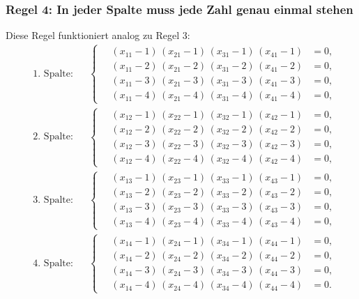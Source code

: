 \subsubsection{Regel 4: In jeder Spalte muss jede Zahl genau einmal stehen}
Diese Regel funktioniert analog zu Regel 3:
\begin{align}
&\text{1. Spalte:}
&&
\left\{\quad
  \begin{aligned}
  (x_{11} - 1)\,(x_{21} - 1)\,(x_{31} - 1)\,(x_{41} - 1) &= 0,\\
  (x_{11} - 2)\,(x_{21} - 2)\,(x_{31} - 2)\,(x_{41} - 2) &= 0,\\
  (x_{11} - 3)\,(x_{21} - 3)\,(x_{31} - 3)\,(x_{41} - 3) &= 0,\\
  (x_{11} - 4)\,(x_{21} - 4)\,(x_{31} - 4)\,(x_{41} - 4) &= 0,
  \end{aligned}
\right.
\\
&\text{2. Spalte:}
&&
\left\{\quad
  \begin{aligned}
  (x_{12} - 1)\,(x_{22} - 1)\,(x_{32} - 1)\,(x_{42} - 1) &= 0,\\
  (x_{12} - 2)\,(x_{22} - 2)\,(x_{32} - 2)\,(x_{42} - 2) &= 0,\\
  (x_{12} - 3)\,(x_{22} - 3)\,(x_{32} - 3)\,(x_{42} - 3) &= 0,\\
  (x_{12} - 4)\,(x_{22} - 4)\,(x_{32} - 4)\,(x_{42} - 4) &= 0,
  \end{aligned}
\right.
\\
&\text{3. Spalte:}
&&
\left\{\quad
  \begin{aligned}
  (x_{13} - 1)\,(x_{23} - 1)\,(x_{33} - 1)\,(x_{43} - 1) &= 0,\\
  (x_{13} - 2)\,(x_{23} - 2)\,(x_{33} - 2)\,(x_{43} - 2) &= 0,\\
  (x_{13} - 3)\,(x_{23} - 3)\,(x_{33} - 3)\,(x_{43} - 3) &= 0,\\
  (x_{13} - 4)\,(x_{23} - 4)\,(x_{33} - 4)\,(x_{43} - 4) &= 0,
  \end{aligned}
\right.
\\
&\text{4. Spalte:}
&&
\left\{\quad
  \begin{aligned}
  (x_{14} - 1)\,(x_{24} - 1)\,(x_{34} - 1)\,(x_{44} - 1) &= 0,\\
  (x_{14} - 2)\,(x_{24} - 2)\,(x_{34} - 2)\,(x_{44} - 2) &= 0,\\
  (x_{14} - 3)\,(x_{24} - 3)\,(x_{34} - 3)\,(x_{44} - 3) &= 0,\\
  (x_{14} - 4)\,(x_{24} - 4)\,(x_{34} - 4)\,(x_{44} - 4) &= 0.
  \end{aligned}
\right.
\label{buchberger:sudoku-gleichung-7}
\end{align}

